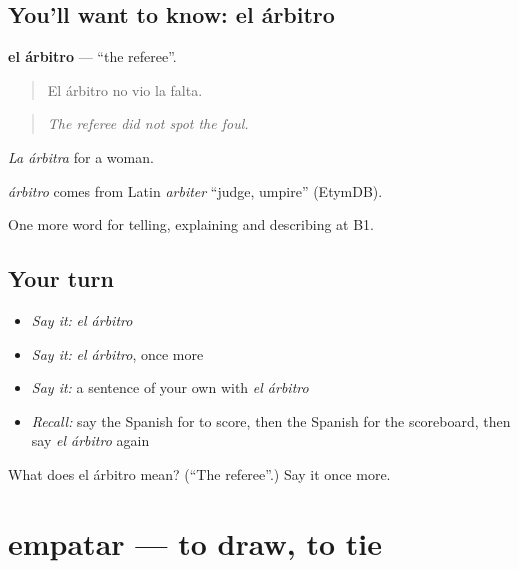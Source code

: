 \subsection*{You'll want to know: el árbitro}
\textbf{el árbitro} — \textquotedblleft{}the referee\textquotedblright{}.

\begin{quote}
El árbitro no vio la falta.
\end{quote}

\begin{quote}
\emph{The referee did not spot the foul.}
\end{quote}

\emph{La árbitra} for a woman.

\begin{cousinweb}
\emph{árbitro} comes from Latin \emph{arbiter} \textquotedblleft{}judge, umpire\textquotedblright{} (EtymDB).
\end{cousinweb}

\begin{grammarlens}[title={What you've built}]
One more word for telling, explaining and describing at B1.
\end{grammarlens}

\subsection*{Your turn}
\begin{itemize}
\raggedright
  \item \emph{Say it:} \emph{el árbitro}
  \item \emph{Say it:} \emph{el árbitro}, once more
  \item \emph{Say it:} a sentence of your own with \emph{el árbitro}
  \item \emph{Recall:} say the Spanish for to score, then the Spanish for the scoreboard, then say \emph{el árbitro} again
\end{itemize}

\begin{tcolorbox}[breakable,colback=teal!4,colframe=teal!35!black,title={Before you move on}]
What does el árbitro mean? (\textquotedblleft{}The referee\textquotedblright{}.) Say it once more.
\end{tcolorbox}
\section[empatar]{empatar — to draw, to tie}

\label{lesson:ES-C756-empatar}



